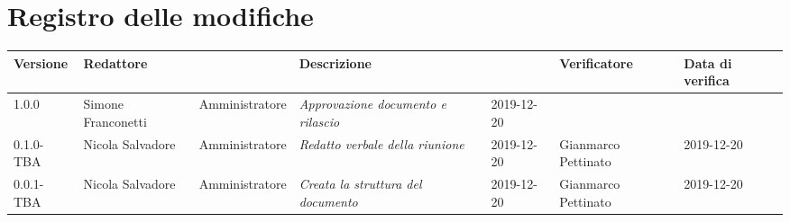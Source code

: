 \section*{Registro delle modifiche}
\renewcommand{\arraystretch}{1.8}

  \begin{longtable}{|p{1.5cm}|p{1.7cm}|p{2cm}|p{2cm}|p{1.7cm}|p{2cm}|p{2.7cm}|}
    \hline
    \rowcolor{header}
    \textbf{Versione} & \textbf{Redattore} & \centering{\textbf{Ruolo}} & \textbf{Descrizione} &      \centering{\textbf{Data}} & \textbf{Verificatore} & \textbf{Data di verifica} \\
    \hline
    1.0.0 & Simone Franconetti & Amministratore & \small{\textit{Approvazione documento e rilascio}} & 2019-12-20 & & \\
    0.1.0-TBA & Nicola Salvadore & Amministratore & \small{\textit{Redatto verbale della riunione}} & 2019-12-20 & Gianmarco Pettinato & 2019-12-20 \\
    0.0.1-TBA & Nicola Salvadore & Amministratore & \small{\textit{Creata la struttura del documento}} & 2019-12-20 & Gianmarco Pettinato & 2019-12-20 \\

    \hline
  \end{longtable}
